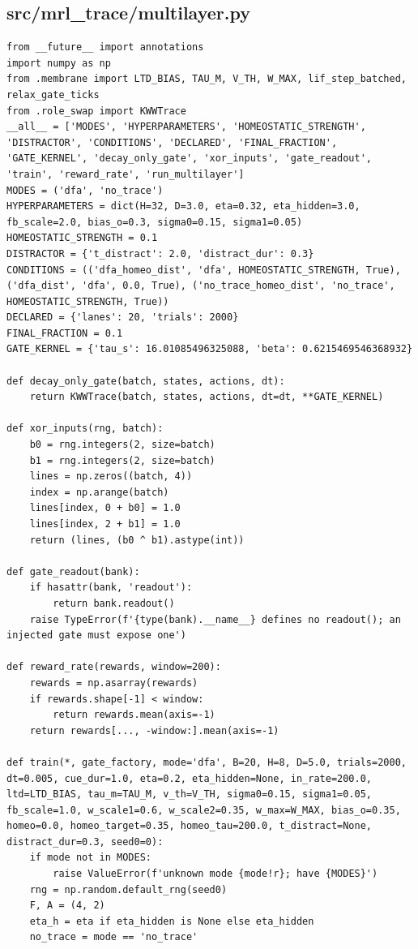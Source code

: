 \documentclass[a4paper,10pt]{article}
\begin{document}
\subsection{src/mrl\_trace/multilayer.py}
\begin{Verbatim}
from __future__ import annotations
import numpy as np
from .membrane import LTD_BIAS, TAU_M, V_TH, W_MAX, lif_step_batched, relax_gate_ticks
from .role_swap import KWWTrace
__all__ = ['MODES', 'HYPERPARAMETERS', 'HOMEOSTATIC_STRENGTH', 'DISTRACTOR', 'CONDITIONS', 'DECLARED', 'FINAL_FRACTION', 'GATE_KERNEL', 'decay_only_gate', 'xor_inputs', 'gate_readout', 'train', 'reward_rate', 'run_multilayer']
MODES = ('dfa', 'no_trace')
HYPERPARAMETERS = dict(H=32, D=3.0, eta=0.32, eta_hidden=3.0, fb_scale=2.0, bias_o=0.3, sigma0=0.15, sigma1=0.05)
HOMEOSTATIC_STRENGTH = 0.1
DISTRACTOR = {'t_distract': 2.0, 'distract_dur': 0.3}
CONDITIONS = (('dfa_homeo_dist', 'dfa', HOMEOSTATIC_STRENGTH, True), ('dfa_dist', 'dfa', 0.0, True), ('no_trace_homeo_dist', 'no_trace', HOMEOSTATIC_STRENGTH, True))
DECLARED = {'lanes': 20, 'trials': 2000}
FINAL_FRACTION = 0.1
GATE_KERNEL = {'tau_s': 16.01085496325088, 'beta': 0.6215469546368932}

def decay_only_gate(batch, states, actions, dt):
    return KWWTrace(batch, states, actions, dt=dt, **GATE_KERNEL)

def xor_inputs(rng, batch):
    b0 = rng.integers(2, size=batch)
    b1 = rng.integers(2, size=batch)
    lines = np.zeros((batch, 4))
    index = np.arange(batch)
    lines[index, 0 + b0] = 1.0
    lines[index, 2 + b1] = 1.0
    return (lines, (b0 ^ b1).astype(int))

def gate_readout(bank):
    if hasattr(bank, 'readout'):
        return bank.readout()
    raise TypeError(f'{type(bank).__name__} defines no readout(); an injected gate must expose one')

def reward_rate(rewards, window=200):
    rewards = np.asarray(rewards)
    if rewards.shape[-1] < window:
        return rewards.mean(axis=-1)
    return rewards[..., -window:].mean(axis=-1)

def train(*, gate_factory, mode='dfa', B=20, H=8, D=5.0, trials=2000, dt=0.005, cue_dur=1.0, eta=0.2, eta_hidden=None, in_rate=200.0, ltd=LTD_BIAS, tau_m=TAU_M, v_th=V_TH, sigma0=0.15, sigma1=0.05, fb_scale=1.0, w_scale1=0.6, w_scale2=0.35, w_max=W_MAX, bias_o=0.35, homeo=0.0, homeo_target=0.35, homeo_tau=200.0, t_distract=None, distract_dur=0.3, seed0=0):
    if mode not in MODES:
        raise ValueError(f'unknown mode {mode!r}; have {MODES}')
    rng = np.random.default_rng(seed0)
    F, A = (4, 2)
    eta_h = eta if eta_hidden is None else eta_hidden
    no_trace = mode == 'no_trace'


\end{Verbatim}
\end{document}

